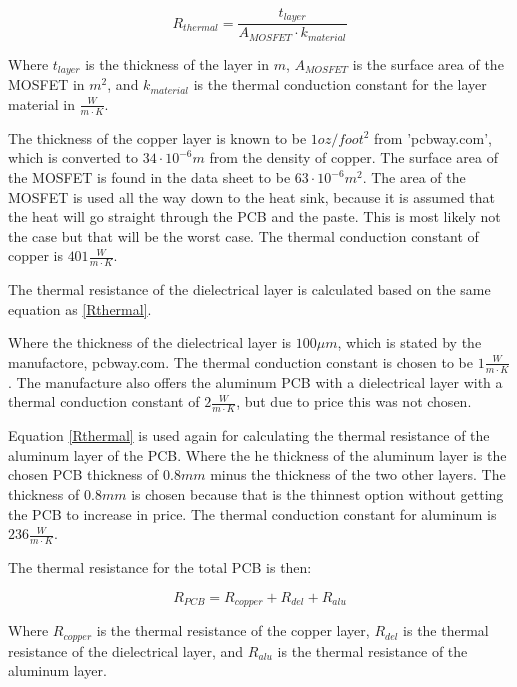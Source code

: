     \begin{equation}
        R_{thermal} = \frac{t_{layer}}{A_{MOSFET} \cdot k_{material}} 
        \label{Rthermal}
    \end{equation}
    
Where $t_{layer}$ is the thickness of the layer in $m$, $A_{MOSFET}$ is the surface area of the MOSFET in $m^2$, and $k_{material}$ is the thermal conduction constant for the layer material in $\frac{W}{m \cdot K}$.

The thickness of the copper layer is known to be $1 oz/foot^2$ from 'pcbway.com', which is converted to $34 \cdot 10^{-6} m$ from the density of copper. The surface area of the MOSFET is found in the data sheet to be $63 \cdot 10^{-6} m^2$.\cite{mosfet} The area of the MOSFET is used all the way down to the heat sink, because it is assumed that the heat will go straight through the PCB and the paste. This is most likely not the case but that will be the worst case.
The thermal conduction constant of copper is $401 \frac{W}{m \cdot K}$.\cite{toolbox}

The thermal resistance of the dielectrical layer is calculated based on the same equation as \ref{Rthermal}.

Where the thickness of the dielectrical layer is $100 \mu m$, which is stated by the manufactore, pcbway.com. The thermal conduction constant is chosen to be $1 \frac{W}{m \cdot K}$. The manufacture also offers the aluminum PCB with a dielectrical layer with a thermal conduction constant of $2 \frac{W}{m \cdot K}$, but due to price this was not chosen.

Equation \ref{Rthermal} is used again for calculating the thermal resistance of the aluminum layer of the PCB.
Where the he thickness of the aluminum layer is the chosen PCB thickness of $0.8 mm$ minus the thickness of the two other layers. The thickness of $0.8 mm$ is chosen because that is the thinnest option without getting the PCB to increase in price. The thermal conduction constant for aluminum is $236 \frac{W}{m \cdot K}$.\cite{toolbox}

The thermal resistance for the total PCB is then:

    \begin{equation}
        R_{PCB} = R_{copper} + R_{del} + R_{alu}
        \label{RPCB}
    \end{equation}

Where $R_{copper}$ is the thermal resistance of the copper layer, $R_{del}$ is the thermal resistance of the dielectrical layer, and $R_{alu}$ is the thermal resistance of the aluminum layer.


